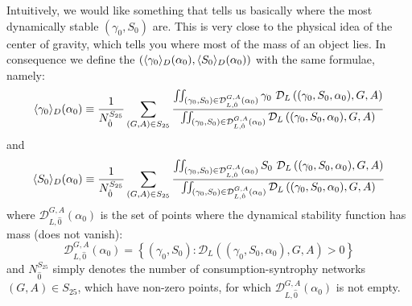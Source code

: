 \documentclass[12pt, titlepage, twoside, openright]{report}
\begin{document}
Intuitively, we would like something that tells us basically where  the most dynamically stable $(\gamma_0, S_0)$ are. This is very close to the physical idea of the center of gravity, which tells you where most of the mass of an object lies. In consequence we define the  $(\langle \gamma_0 \rangle_D(\alpha_0), \langle S_0 \rangle_D(\alpha_0))$ with the same formulae, namely:
\begin{equation}
\av{\gamma_0}_D(\alpha_0) \defined \frac{1}{N_{\hat{0}}^{S_{25}}}\sum_{(G,A) \in S_{25}} \frac{\iint_{(\gamma_0, S_0) \in \mathcal{D}_{L, \hat{0}}^{G,A}\left(\alpha_0\right)}  \gamma_0 \ \mathcal{D}_{L}\left((\gamma_0, S_0, \alpha_0), G, A\right)}{\iint_{(\gamma_0, S_0) \in \mathcal{D}_{L, \hat{0}}^{G,A}\left(\alpha_0\right)} \mathcal{D}_{L}\left((\gamma_0, S_0, \alpha_0), G, A\right) }
\end{equation}
and
\begin{equation}
\av{S_0}_D(\alpha_0) \defined \frac{1}{N_{\hat{0}}^{S_{25}}}\sum_{(G,A) \in S_{25}} \frac{\iint_{(\gamma_0, S_0) \in \mathcal{D}_{L, \hat{0}}^{G,A}\left(\alpha_0\right)}  S_0 \ \mathcal{D}_{L}\left((\gamma_0, S_0, \alpha_0), G, A\right)}{\iint_{(\gamma_0, S_0) \in \mathcal{D}_{L, \hat{0}}^{G,A}\left(\alpha_0\right)} \mathcal{D}_{L}\left((\gamma_0, S_0, \alpha_0), G, A\right) }
\end{equation}
where $\mathcal{D}_{L, \hat{0}}^{G,A}\left(\alpha_0\right)$ is the set of points where the dynamical stability function has mass (\ie does not vanish):
\begin{equation}
\mathcal{D}_{L, \hat{0}}^{G,A}\left(\alpha_0\right) = \left\{(\gamma_0, S_0):\mathcal{D}_L\left((\gamma_0, S_0, \alpha_0), G, A\right) > 0\right\}
\end{equation}
and $N_{\hat{0}}^{S_{25}}$ simply denotes the number of consumption-syntrophy networks $(G,A) \in S_{25}$, which have non-zero points, \ie for which $\mathcal{D}_{L, \hat{0}}^{G,A}\left(\alpha_0\right)$ is not empty.
\end{document}
